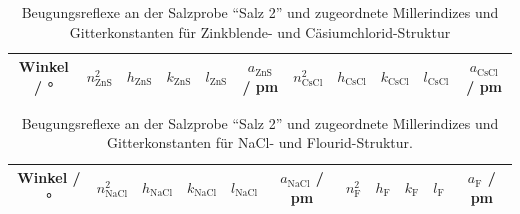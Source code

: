 \begin{table}[H]
  \centering
  \caption{Beugungsreflexe an der Salzprobe \enquote{Salz 2} und zugeordnete Millerindizes und Gitterkonstanten
  für Zinkblende- und Cäsiumchlorid-Struktur}
  \label{Tab:Salza}
  \begin{tabular}{c || c c c c c|c c c c c}
    \toprule
    Winkel / ° &
    $n_{\text{ZnS}}^{2}$ &
    $h_{\text{ZnS}}$ &
    $k_{\text{ZnS}}$ &
    $l_{\text{ZnS}}$ &
    $a_{\text{ZnS}}$ / pm &
    $n_{\text{CsCl}}^{2}$ &
    $h_{\text{CsCl}}$ &
    $k_{\text{CsCl}}$ &
    $l_{\text{CsCl}}$ &
    $a_{\text{CsCl}}$ / pm \\
    \midrule
    
    \bottomrule
  \end{tabular}
\end{table}

\begin{table}[H]
  \centering
  \caption{Beugungsreflexe an der Salzprobe \enquote{Salz 2} und zugeordnete Millerindizes und Gitterkonstanten
  für NaCl- und Flourid-Struktur.}
  \label{Tab:Salzb}
  \begin{tabular}{c || c c c c c|c c c c c}
    \toprule
    Winkel / ° &
    $n_{\text{NaCl}}^{2}$ &
    $h_{\text{NaCl}}$ &
    $k_{\text{NaCl}}$ &
    $l_{\text{NaCl}}$ &
    $a_{\text{NaCl}}$ / pm &
    $n_{\text{F}}^{2}$ &
    $h_{\text{F}}$ &
    $k_{\text{F}}$ &
    $l_{\text{F}}$ &
    $a_{\text{F}}$ / pm \\
    \midrule
    
    \bottomrule
  \end{tabular}
\end{table}

